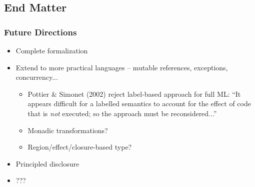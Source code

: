 \documentclass{beamer}
\begin{document}
\subsection{End Matter}
\begin{frame}
  \frametitle{Future Directions}
  \begin{itemize}
    \item Complete formalization
    \item Extend to more practical languages -- mutable references, exceptions,
          concurrency...
      \begin{itemize}
        \item Pottier \& Simonet (2002) reject label-based approach for full
              ML: ``It appears difficult for a labelled semantics to account
              for the effect of code that is \emph{not} executed; so the
              approach must be reconsidered...''
        \item Monadic transformations?
        \item Region/effect/closure-based type?
      \end{itemize}
    \item Principled disclosure
    \item ???
  \end{itemize}
\end{frame}
\end{document}
